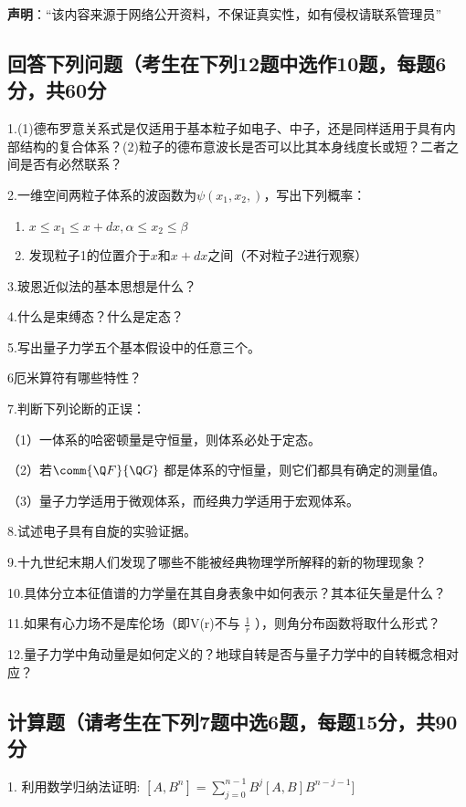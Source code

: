 
\textbf{声明}：“该内容来源于网络公开资料，不保证真实性，如有侵权请联系管理员”

\subsection{回答下列问题（考生在下列12题中选作10题，每题6分，共60分}

1.(1)德布罗意关系式是仅适用于基本粒子如电子、中子，还是同样适用于具有内部结构的复合体系？(2)粒子的德布意波长是否可以比其本身线度长或短？二者之间是否有必然联系？

2.一维空间两粒子体系的波函数为$\psi (x_1, x_2, )$，写出下列概率：
\begin{enumerate}
    \item $x \leq x_1 \leq x + dx, \alpha \leq x_2 \leq \beta$
    \item 发现粒子1的位置介于$x$和$x + dx$之间（不对粒子2进行观察）
\end{enumerate}

3.玻恩近似法的基本思想是什么？

4.什么是束缚态？什么是定态？

5.写出量子力学五个基本假设中的任意三个。

6厄米算符有哪些特性？

7.判断下列论断的正误：

（1）一体系的哈密顿量是守恒量，则体系必处于定态。

（2）若$\comm{\Q F}{\Q G}$ 都是体系的守恒量，则它们都具有确定的测量值。

（3）量子力学适用于微观体系，而经典力学适用于宏观体系。

8.试述电子具有自旋的实验证据。

9.十九世纪末期人们发现了哪些不能被经典物理学所解释的新的物理现象？

10.具体分立本征值谱的力学量在其自身表象中如何表示？其本征矢量是什么？

11.如果有心力场不是库伦场（即V(r)不与 $\frac{1}{r}$ ），则角分布函数将取什么形式？

12.量子力学中角动量是如何定义的？地球自转是否与量子力学中的自转概念相对应？

\subsection{计算题（请考生在下列7题中选6题，每题15分，共90分}

1. 利用数学归纳法证明:
$[A, B^n] = \sum_{j=0}^{n-1} B^j [A, B] B^{n-j-1}]$

